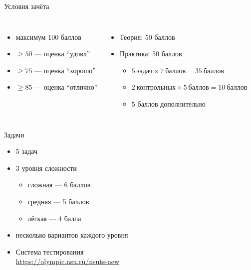 \documentclass[aspectratio=169,14pt]{beamer}
\begin{document}
    \begin{frame}{Условия зачёта}
        \begin{columns}
                \begin{itemize}
                    \item максимум 100 баллов
                    \item $\geqslant 50$ --- оценка ``удовл''
                    \item $\geqslant 75$ --- оценка ``хорошо''
                    \item $\geqslant 85$ --- оценка ``отлично''
                \end{itemize}
                \begin{itemize}
                    \item Теория: 50 баллов
                    \item Практика: 50 баллов
                        \begin{itemize}
                            \item $5~\text{задач} \times 7~\text{баллов} = 35~\text{баллов}$
                            \item $2~\text{контрольных} \times 5~\text{баллов} = 10~\text{баллов}$
                            \item $5$ баллов дополнительно
                        \end{itemize}
                \end{itemize}
        \end{columns}
    \end{frame}

    \begin{frame}{Задачи}
        \begin{itemize}
            \item 5 задач
            \item 3 уровня сложности
                \begin{itemize}
                    \item сложная --- 6 баллов
                    \item средняя --- 5 баллов
                    \item лёгкая --- 4 балла
                \end{itemize}
            \item несколько вариантов каждого уровня
            \item Система тестирования \\
                \url{https://olympic.nsu.ru/nsuts-new}
        \end{itemize}
    \end{frame}
\end{document}
